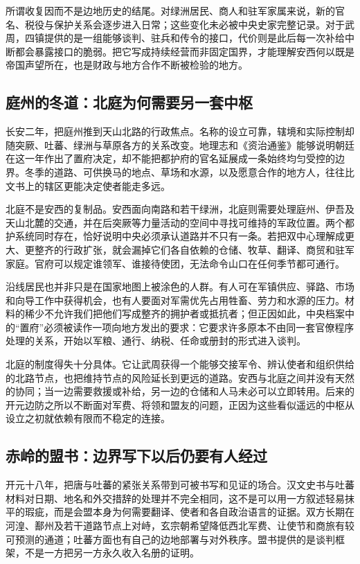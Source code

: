 所谓收复因而不是边地历史的结尾。对绿洲居民、商人和驻军家属来说，新的官名、税役与保护关系会逐步进入日常；这些变化未必被中央史家完整记录。对于武周，四镇提供的是一组能够谈判、驻兵和传令的接口，代价则是此后每一次补给中断都会暴露接口的脆弱。把它写成持续经营而非固定国界，才能理解安西何以既是帝国声望所在，也是财政与地方合作不断被检验的地方。

\subsection{庭州的冬道：北庭为何需要另一套中枢}
长安二年，把庭州推到天山北路的行政焦点。名称的设立可靠，辖境和实际控制却随突厥、吐蕃、绿洲与草原各方的关系改变。地理志和《资治通鉴》能够说明朝廷在这一年作出了置府决定，却不能把都护府的官名延展成一条始终均匀受控的边界。冬季的道路、可供换马的地点、草场和水源，以及愿意合作的地方人，往往比文书上的辖区更能决定使者能走多远。

北庭不是安西的复制品。安西面向南路和若干绿洲，北庭则需要处理庭州、伊吾及天山北麓的交通，并在后突厥等力量活动的空间中寻找可维持的军政位置。两个都护系统同时存在，恰好说明中央必须承认道路并不只有一条。若把双中心理解成更大、更整齐的行政扩张，就会漏掉它们各自依赖的仓储、牧草、翻译、商贸和驻军家庭。官府可以规定谁领军、谁接待使团，无法命令山口在任何季节都可通行。

沿线居民也并非只是在国家地图上被涂色的人群。有人可在军镇供应、驿路、市场和向导工作中获得机会，也有人要面对军需优先占用牲畜、劳力和水源的压力。材料的稀少不允许我们把他们写成整齐的拥护者或抵抗者；但正因如此，中央档案中的“置府”必须被读作一项向地方发出的要求：它要求许多原本不由同一套官僚程序处理的关系，开始以军粮、通行、纳税、任命或册封的形式进入谈判。

北庭的制度得失十分具体。它让武周获得一个能够交接军令、辨认使者和组织供给的北路节点，也把维持节点的风险延长到更远的道路。安西与北庭之间并没有天然的协同；当一边需要救援或补给，另一边的仓储和人马未必可以立即转用。后来的开元边防之所以不断面对军费、将领和盟友的问题，正因为这些看似遥远的中枢从设立之初就依赖有限而不稳定的连接。

\subsection{赤岭的盟书：边界写下以后仍要有人经过}
开元十八年，把唐与吐蕃的紧张关系带到可被书写和见证的场合。汉文史书与吐蕃材料对日期、地名和外交措辞的处理并不完全相同，这不是可以用一方叙述轻易抹平的瑕疵，而是会盟本身为何需要翻译、使者和各自政治语言的证据。双方长期在河湟、鄯州及若干道路节点上对峙，玄宗朝希望降低西北军费、让使节和商旅有较可预测的通道；吐蕃方面也有自己的边地部署与对外秩序。盟书提供的是谈判框架，不是一方把另一方永久收入名册的证明。

